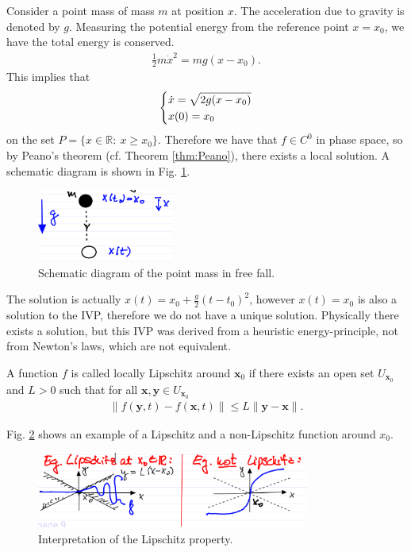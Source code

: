 \begin{ex}
	Consider a point mass of mass $m$ at position $x$. The acceleration due to gravity is denoted by $g$. Measuring the potential energy from the reference point $x=x_0$, we have the total energy is conserved.
	\begin{align}
		\frac{1}{2} m \dot{x}^2 = mg(x-x_0).
	\end{align}
This implies that
\begin{align}
	\begin{dcases}
		\dot{x} = \sqrt{2g(x-x_0)} \\
		x(0) = x_0
	\end{dcases}
\end{align}
on the set $P = \{ x \in \mathbb{R}:\ x \geq x_0\}$. Therefore we have that $f\in C^0$ in phase space, so by Peano's theorem (cf. Theorem \ref{thm:Peano}), there exists a local solution. A schematic diagram is shown in Fig. \ref{fig:point_mass}. 
	\begin{figure}[h!]
		\centering
		\includegraphics[width=0.4\textwidth]{figures/ch1/1freefall.png}
		\caption{Schematic diagram of the point mass in free fall.}
		\label{fig:point_mass}
	\end{figure}
	The solution is actually $x(t) = x_0 + \frac{g}{2}(t-t_0)^2$, however $x(t) = x_0$ is also a solution to the IVP, therefore we do not have a unique solution. Physically there exists a solution, but this IVP was derived from a heuristic energy-principle, not from Newton's laws, which are not equivalent.
\end{ex}
\begin{definition}
A function $f$ is called locally Lipschitz around $ \textbf{x}_0$ if there exists an open set $U_{ \textbf{x}_0}$ and $L>0$ such that for all $ \textbf{x}, \textbf{y} \in U_{ \textbf{x}_0}$
\begin{align}
	\boxed{\left \| f( \textbf{y},t) - f( \textbf{x},t)\right \| \leq L  \| \textbf{y} -  \textbf{x} \|.}
\end{align}
\end{definition}

\begin{ex}
	Fig. \ref{fig:Lipschitz_ex} shows an example of a Lipschitz and a non-Lipschitz function around $x_0$.
	\begin{figure}[h!]
		\centering
		\includegraphics[width=0.8\textwidth]{figures/ch1/2lipschitz.png}
		\caption{Interpretation of the Lipschitz property.}
		\label{fig:Lipschitz_ex}
	\end{figure}
\end{ex}

